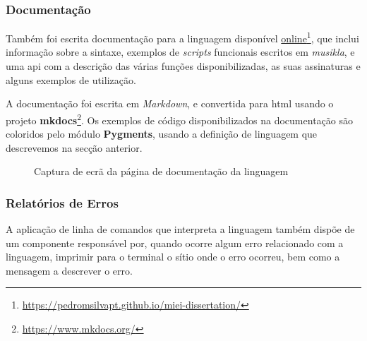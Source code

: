\newpage

\subsubsection{Documentação}
Também foi escrita documentação para a linguagem disponível \href{https://pedromsilvapt.github.io/miei-dissertation/}{online}\footnote{\url{https://pedromsilvapt.github.io/miei-dissertation/}}, que inclui informação sobre a sintaxe, exemplos de \textit{scripts} funcionais escritos em \textit{musikla}, e uma \acrshort{api} com a descrição das várias funções disponibilizadas, as suas assinaturas e alguns exemplos de utilização.

A documentação foi escrita em \textit{Markdown}, e convertida para \acrshort{html} usando o projeto \textbf{mkdocs}\footnote{\url{https://www.mkdocs.org/}}. Os exemplos de código disponibilizados na documentação são coloridos pelo módulo \textbf{Pygments}, usando a definição de linguagem que descrevemos na secção anterior.

\begin{figure}[ht]
  \centering
  {%
  \setlength{\fboxsep}{0pt}%
  \setlength{\fboxrule}{0pt}%
  }%
  \caption{Captura de ecrã da página de documentação da linguagem}
  \label{fig:documentation-screenshot}
\end{figure}

\subsubsection{Relatórios de Erros}
A aplicação de linha de comandos que interpreta a linguagem também dispõe de um componente responsável por, quando ocorre algum erro relacionado com a linguagem, imprimir para o terminal o sítio onde o erro ocorreu, bem como a mensagem a descrever o erro.

